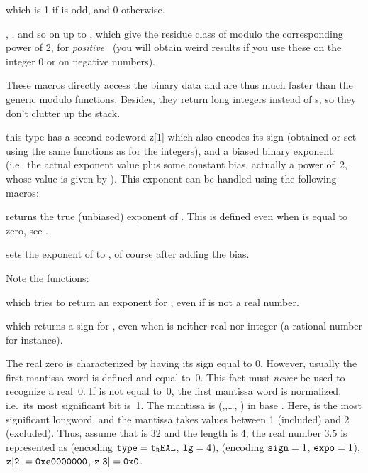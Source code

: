  which is 1 if  is odd, and 0 otherwise.

, , and so on up to ,
which give the residue class of  modulo the corresponding power of
2, for {\it positive\/}~ (you will obtain weird results if you use
these on the integer 0 or on negative numbers).

These macros directly access the binary data and are thus much faster than
the generic modulo functions. Besides, they return long integers instead of
s, so they don't clutter up the stack.

this type has a second codeword z[1] which also encodes its sign (obtained
or set using the same functions as for the integers), and a biased binary
exponent (i.e.~the actual exponent value plus some constant bias, actually
a power of~2, whose value is given by ). This exponent can
be handled using the following macros:

 returns the true (unbiased) exponent of .
This is defined even when  is equal to zero, see
.

 sets the exponent of  to ,
of course after adding the bias.

\noindent Note the functions:

 which tries to return an exponent for ,
even if  is not a real number.

 which returns a sign for , even when
 is neither real nor integer (a rational number for instance).

The real zero is characterized by having its sign equal to 0. However,
usually the first mantissa word  is defined and equal to~0. This
fact must {\it never\/} be used to recognize a real~0. If  is not
equal to~0, the first mantissa word  is normalized, i.e.~its most
significant bit is~1. The mantissa is (,,\dots,%
\kbd{z[lg(z]-1]}) in base . Here,  is
the most significant longword, and the mantissa takes values between
1 (included) and 2 (excluded). Thus, assume that  is 32 and
the length is 4, the real number $3.5$ is represented as  (encoding
${\tt type} = {\tt t_REAL}$, ${\tt lg} = 4$),  (encoding ${\tt sign} =
1$, ${\tt expo} = 1$), ${\tt z[2]} = {\tt 0xe0000000}$,
${\tt z[3]} = {\tt 0x0}$.

